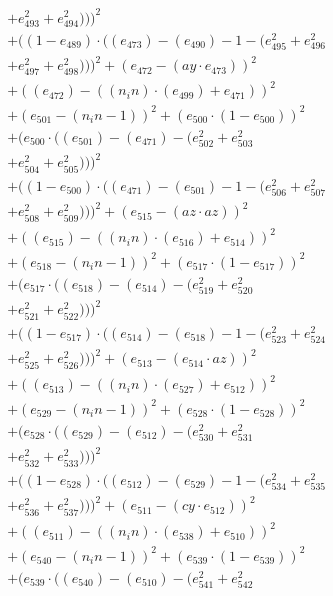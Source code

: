 \documentclass[10pt, a4paper]{article}
\begin{document}
\begin{small}
\begin{align*}
& + e_{493}^{2} + e_{494}^{2})))^{2} \\
& + ((1 - e_{489})  \cdot  ((e_{473}) - (e_{490}) - 1 - (e_{495}^{2} + e_{496}^{2} \\
& + e_{497}^{2} + e_{498}^{2})))^{2} + (e_{472} - (ay  \cdot  e_{473}))^{2} \\
& + ((e_{472}) - ((n_in)  \cdot  (e_{499}) + e_{471}))^{2} \\
& + (e_{501} - (n_in - 1))^{2} + (e_{500}  \cdot  (1 - e_{500}))^{2} \\
& + (e_{500}  \cdot  ((e_{501}) - (e_{471}) - (e_{502}^{2} + e_{503}^{2} \\
& + e_{504}^{2} + e_{505}^{2})))^{2} \\
& + ((1 - e_{500})  \cdot  ((e_{471}) - (e_{501}) - 1 - (e_{506}^{2} + e_{507}^{2} \\
& + e_{508}^{2} + e_{509}^{2})))^{2} + (e_{515} - (az  \cdot  az))^{2} \\
& + ((e_{515}) - ((n_in)  \cdot  (e_{516}) + e_{514}))^{2} \\
& + (e_{518} - (n_in - 1))^{2} + (e_{517}  \cdot  (1 - e_{517}))^{2} \\
& + (e_{517}  \cdot  ((e_{518}) - (e_{514}) - (e_{519}^{2} + e_{520}^{2} \\
& + e_{521}^{2} + e_{522}^{2})))^{2} \\
& + ((1 - e_{517})  \cdot  ((e_{514}) - (e_{518}) - 1 - (e_{523}^{2} + e_{524}^{2} \\
& + e_{525}^{2} + e_{526}^{2})))^{2} + (e_{513} - (e_{514}  \cdot  az))^{2} \\
& + ((e_{513}) - ((n_in)  \cdot  (e_{527}) + e_{512}))^{2} \\
& + (e_{529} - (n_in - 1))^{2} + (e_{528}  \cdot  (1 - e_{528}))^{2} \\
& + (e_{528}  \cdot  ((e_{529}) - (e_{512}) - (e_{530}^{2} + e_{531}^{2} \\
& + e_{532}^{2} + e_{533}^{2})))^{2} \\
& + ((1 - e_{528})  \cdot  ((e_{512}) - (e_{529}) - 1 - (e_{534}^{2} + e_{535}^{2} \\
& + e_{536}^{2} + e_{537}^{2})))^{2} + (e_{511} - (cy  \cdot  e_{512}))^{2} \\
& + ((e_{511}) - ((n_in)  \cdot  (e_{538}) + e_{510}))^{2} \\
& + (e_{540} - (n_in - 1))^{2} + (e_{539}  \cdot  (1 - e_{539}))^{2} \\
& + (e_{539}  \cdot  ((e_{540}) - (e_{510}) - (e_{541}^{2} + e_{542}^{2} \\

\end{align*}
\end{small}
\end{document}
